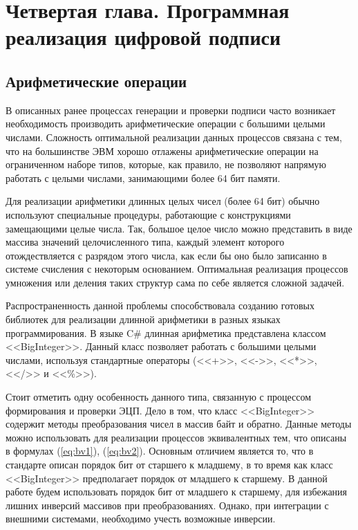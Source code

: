 \chapter{Четвертая глава. Программная реализация цифровой подписи}
\label{cha:ch_4}
\section{Арифметические операции}
\par
В описанных ранее процессах генерации и проверки подписи часто возникает необходимость производить арифметические операции с большими целыми числами. Сложность оптимальной реализации данных процессов связана с тем, что на большинстве ЭВМ хорошо отлажены арифметические операции на ограниченном наборе типов, которые, как правило, не позволяют напрямую работать с целыми числами, занимающими более 64 бит памяти.
\par
Для реализации арифметики длинных целых чисел (более 64 бит) обычно используют специальные процедуры, работающие с конструкциями замещающими целые числа. Так, большое целое число можно представить в виде массива значений целочисленного типа, каждый элемент которого отождествляется с разрядом этого числа, как если бы оно было записанно в системе счисления с некоторым основанием. Оптимальная реализация процессов умножения или деления таких структур сама по себе является сложной задачей.
\par
Распространенность данной проблемы способствовала созданию готовых библиотек для реализации длинной арифметики в разных языках программирования. В языке C\# длинная арифметика представлена классом <<BigInteger>>. Данный класс позволяет работать с большими целыми числами, используя стандартные операторы (<<+>>, <<->>, <<*>>, <</>> и <<\%>>).
\par
Стоит отметить одну особенность данного типа, связанную с процессом формирования и проверки ЭЦП. Дело в том, что класс <<BigInteger>> содержит методы преобразования чисел в массив байт и обратно. Данные методы можно использовать для реализации процессов эквивалентных тем, что описаны в формулах (\ref{eq:bv1}), (\ref{eq:bv2}). Основным отличием является то, что в стандарте описан порядок бит от старшего к младшему, в то время как класс <<BigInteger>> предполагает порядок от младшего к старшему. В данной работе будем использовать порядок бит от младшего к старшему, для избежания лишних инверсий массивов при преобразованиях. Однако, при интеграции с внешними системами, необходимо учесть возможные инверсии. 
